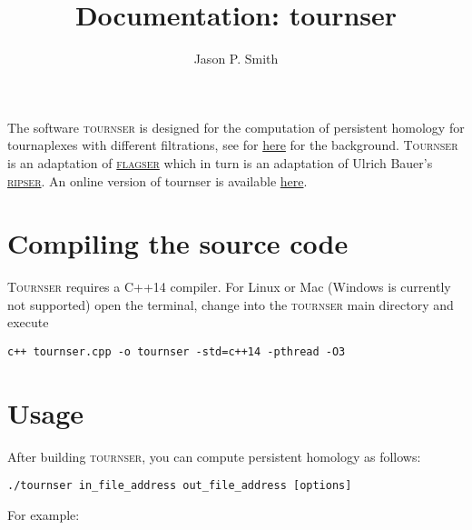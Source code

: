 \documentclass{amsart}
\theoremstyle{definition}
\begin{document}
\title{Documentation: tournser}

\author{Jason P. Smith}
\address{University of Aberdeen, Aberdeen, United Kingdom}

\maketitle

\noindent
The software \textsc{tournser} is designed for the computation of persistent
homology for tournaplexes with different filtrations, see for \href{https://arxiv.org/abs/2003.00324}{here} for the background.
\textsc{Tournser} is an adaptation of \href{https://github.com/luetge/flagser}{\textsc{flagser}}
 which in turn is an adaptation of Ulrich Bauer's
\href{https://github.com/Ripser/ripser}{\textsc{ripser}}.
An online version of tournser is available \href{https://homepages.abdn.ac.uk/neurotopology/tournser.html}{here}.


\section{Compiling the source code}
\noindent
\textsc{Tournser} requires a C++14 compiler.
For Linux or Mac (Windows is currently not supported) open the terminal, change into the \textsc{tournser} main directory and execute

\vspace{1em}

\begin{verbatim}c++ tournser.cpp -o tournser -std=c++14 -pthread -O3\end{verbatim}

\vspace{1em}

\section{Usage}
\noindent
After building \textsc{tournser}, you can compute persistent homology as follows:

\vspace{1em}

\begin{verbatim}./tournser in_file_address out_file_address [options]\end{verbatim}

\vspace{1em}

For example:

\vspace{1em}
\end{document}
